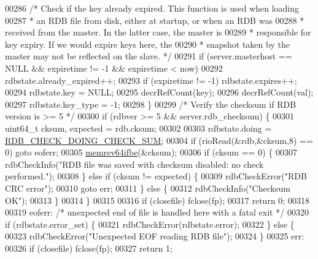\begin{DoxyCode}
{{{{{{{{{{{{00286         \textcolor{comment}{/* Check if the key already expired. This function is used when loading}
00287 \textcolor{comment}{         * an RDB file from disk, either at startup, or when an RDB was}
00288 \textcolor{comment}{         * received from the master. In the latter case, the master is}
00289 \textcolor{comment}{         * responsible for key expiry. If we would expire keys here, the}
00290 \textcolor{comment}{         * snapshot taken by the master may not be reflected on the slave. */}
00291         \textcolor{keywordflow}{if} (server.masterhost == NULL && expiretime != -1 && expiretime < now)
00292             rdbstate.already\_expired++;
00293         \textcolor{keywordflow}{if} (expiretime != -1) rdbstate.expires++;
00294         rdbstate.key = NULL;
00295         decrRefCount(key);
00296         decrRefCount(val);
00297         rdbstate.key\_type = -1;
00298     \}
00299     \textcolor{comment}{/* Verify the checksum if RDB version is >= 5 */}
00300     \textcolor{keywordflow}{if} (rdbver >= 5 && server.rdb\_checksum) \{
00301         uint64\_t cksum, expected = rdb.cksum;
00302 
00303         rdbstate.doing = \hyperlink{redis-check-rdb_8c_aa43bb9440ce7c820f089f811cb19a790}{RDB\_CHECK\_DOING\_CHECK\_SUM};
00304         \textcolor{keywordflow}{if} (rioRead(&rdb,&cksum,8) == 0) \textcolor{keywordflow}{goto} eoferr;
00305         \hyperlink{endianconv_8h_aa311b9f944c3b988f3601698a95890c1}{memrev64ifbe}(&cksum);
00306         \textcolor{keywordflow}{if} (cksum == 0) \{
00307             rdbCheckInfo(\textcolor{stringliteral}{"RDB file was saved with checksum disabled: no check performed."});
00308         \} \textcolor{keywordflow}{else} \textcolor{keywordflow}{if} (cksum != expected) \{
00309             rdbCheckError(\textcolor{stringliteral}{"RDB CRC error"});
00310             \textcolor{keywordflow}{goto} err;
00311         \} \textcolor{keywordflow}{else} \{
00312             rdbCheckInfo(\textcolor{stringliteral}{"Checksum OK"});
00313         \}
00314     \}
00315 
00316     \textcolor{keywordflow}{if} (closefile) fclose(fp);
00317     \textcolor{keywordflow}{return} 0;
00318 
00319 eoferr: \textcolor{comment}{/* unexpected end of file is handled here with a fatal exit */}
00320     \textcolor{keywordflow}{if} (rdbstate.error\_set) \{
00321         rdbCheckError(rdbstate.error);
00322     \} \textcolor{keywordflow}{else} \{
00323         rdbCheckError(\textcolor{stringliteral}{"Unexpected EOF reading RDB file"});
00324     \}
00325 err:
00326     \textcolor{keywordflow}{if} (closefile) fclose(fp);
00327     \textcolor{keywordflow}{return} 1;
}}}}}}}}}}}}
\end{DoxyCode}
